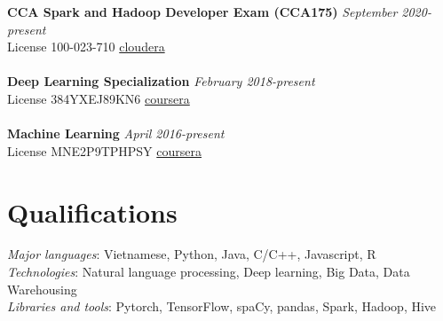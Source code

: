 \documentclass[11pt,a4paper,roman]{article}
\begin{document}
\textbf{CCA Spark and Hadoop Developer Exam (CCA175)}
\hfill
\textit{September 2020-present} \\
License 100-023-710
\hfill
\href{http://certification.cloudera.com/verify/user}{cloudera}
\\\\
\textbf{Deep Learning Specialization}
\hfill
\textit{February 2018-present} \\
License 384YXEJ89KN6
\hfill
\href{https://www.coursera.org/account/accomplishments/verify/384YXEJ89KN6}{coursera}
\\\\
\textbf{Machine Learning}
\hfill
\textit{April 2016-present} \\
License MNE2P9TPHPSY
\hfill
\href{https://www.coursera.org/account/accomplishments/verify/MNE2P9TPHPSY}{coursera} 

\section{Qualifications}

\textit{Major languages}: Vietnamese, Python, Java, C/C++, Javascript, R
\\
\textit{Technologies}: Natural language processing, Deep learning, Big Data, Data Warehousing
\\
\textit{Libraries and tools}: Pytorch, TensorFlow, spaCy, pandas, Spark, Hadoop, Hive
\end{document}
